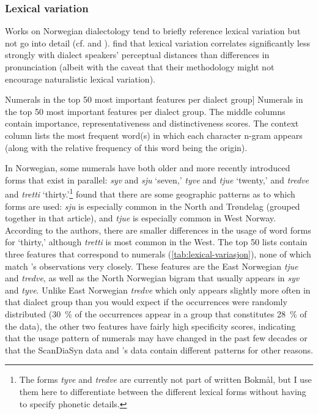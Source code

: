 \subsubsection{Lexical variation}

Works on Norwegian dialectology tend to briefly reference lexical variation but not go into detail
(cf. \citet[p.~104]{sandoey1991dialektkunnskap} and \citet[pp.~114--115]{hanssen2010dialekter}).
\citet{gooskens2006relative} find that lexical variation correlates significantly less strongly with dialect speakers' perceptual distances than differences in pronunciation (albeit with the caveat that their methodology might not encourage naturalistic lexical variation).

\begin{table}[htbp]
    
    \caption
    [Numerals in the top 50 most important features per dialect group]
    {Numerals in the top 50 most important features per dialect group.
    The middle columns contain importance, representativeness and distinctiveness scores.
    The context column lists the most frequent word(s) in which each character n-gram appears (along with the relative frequency of this word being the origin).}
    \label{tab:lexical-variasjon}
\end{table}

In Norwegian, some numerals have both older and more recently introduced forms that exist in parallel:
\textit{syv} and \textit{sju} `seven,' \textit{tyve} and \textit{tjue} `twenty,' and \textit{tredve} and \textit{tretti} `thirty.'\footnote{%
The forms \textit{tyve} and \textit{tredve} are currently not part of written Bokmål, but I use them here to differentiate between the different lexical forms without having to specify phonetic details.
}
\citet{kvale1997counting} found that there are some geographic patterns as to which forms are used:
\textit{sju} is especially common in the North and Tr\o{}ndelag (grouped together in that article), and \textit{tjue} is especially common in West Norway. 
According to the authors, there are smaller differences in the usage of word forms for `thirty,' although \textit{tretti} is most common in the West.
The top 50 lists contain three features that correspond to numerals (\autoref{tab:lexical-variasjon}), none of which match \citeauthor{kvale1997counting}'s observations very closely.
These features are the East Norwegian \textit{tjue} and \textit{tredve}, as well as the North Norwegian bigram  that usually appears in \textit{syv} and \textit{tyve}.
Unlike East Norwegian \textit{tredve} which only appears slightly more often in that dialect group than you would expect if the occurrences were randomly distributed (30~\% of the occurrences appear in a group that constitutes 28~\% of the data), the other two features have fairly high specificity scores, indicating that the usage pattern of numerals may have changed in the past few decades or that the ScanDiaSyn data and \citeauthor{kvale1997counting}'s data contain different patterns for other reasons.

